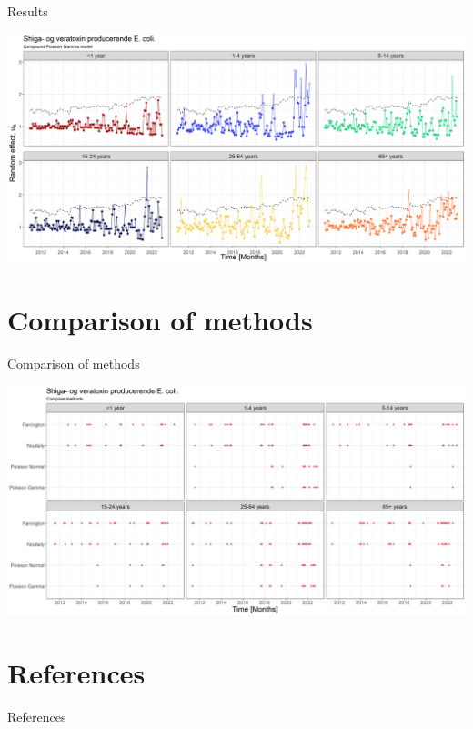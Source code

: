 \documentclass[aspectratio=169]{beamer}
\begin{document}
\begin{frame}{Results}
\protect\hypertarget{results-3}{}
\tiny

\includegraphics[width=1\linewidth]{../figures/windowedSTECPoisGExclude}

\normalsize
\end{frame}

\hypertarget{comparison-of-methods}{%
\section{Comparison of methods}\label{comparison-of-methods}}

\begin{frame}{Comparison of methods}
\tiny

\includegraphics[width=1\linewidth]{../figures/compareMethods}

\normalsize
\end{frame}

\hypertarget{references}{%
\section{References}\label{references}}

\begin{frame}{References}
\printbibliography[heading=none]
\end{frame}
\end{document}
